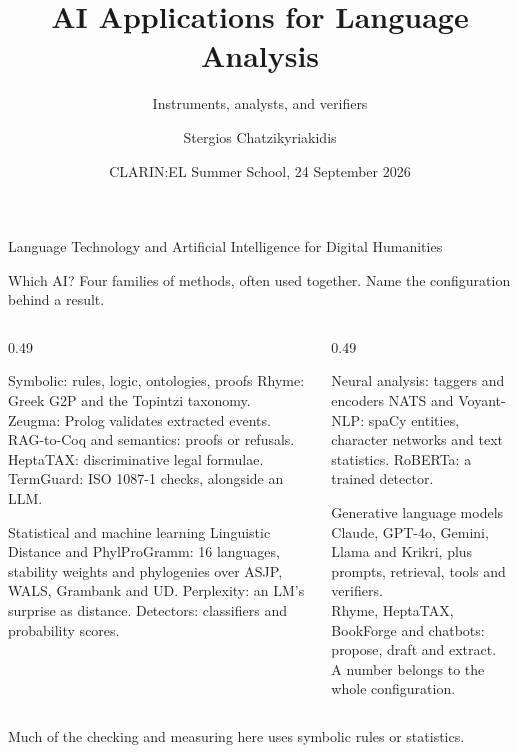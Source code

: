 \documentclass[aspectratio=169, 10pt]{beamer}
\title{AI Applications for Language Analysis}
\subtitle{Instruments, analysts, and verifiers}
\author{Stergios Chatzikyriakidis}
\institute{ILSP}
\date{CLARIN:EL Summer School, 24 September 2026}
\begin{document}
\begin{frame}
  \vspace{1em}
  {\LARGE\bfseries\inserttitle\par}
  \vspace{0.5em}
  {\large\insertsubtitle\par}
  \vspace{0.4em}{\color{terracotta}\rule{\textwidth}{1pt}}
  \vspace{0.7em}
  {\large\insertauthor\par}
  \insertinstitute\par
  \vspace{0.7em}\insertdate\par
  \small Language Technology and Artificial Intelligence for Digital Humanities
\end{frame}

\begin{frame}{Which AI?}
  \small Four families of methods, often used together. Name the configuration behind a result.
  \begin{columns}[T]
    \begin{column}{0.49\textwidth}
      \begin{block}{Symbolic: rules, logic, ontologies, proofs}
        \footnotesize Rhyme: Greek G2P and the Topintzi taxonomy.\\
        Zeugma: Prolog validates extracted events.\\
        RAG-to-Coq and semantics: proofs or refusals.\\
        HeptaTAX: discriminative legal formulae.\\
        TermGuard: ISO 1087-1 checks, alongside an LLM.
      \end{block}
      \begin{block}{Statistical and machine learning}
        \footnotesize Linguistic Distance and PhylProGramm: 16 languages, stability weights and phylogenies over ASJP, WALS, Grambank and UD. Perplexity: an LM's surprise as distance. Detectors: classifiers and probability scores.
      \end{block}
    \end{column}
    \begin{column}{0.49\textwidth}
      \begin{block}{Neural analysis: taggers and encoders}
        \footnotesize NATS and Voyant-NLP: spaCy entities, character networks and text statistics. RoBERTa: a trained detector.
      \end{block}
      \begin{block}{Generative language models}
        \footnotesize Claude, GPT-4o, Gemini, Llama and Krikri, plus prompts, retrieval, tools and verifiers.\\
        Rhyme, HeptaTAX, BookForge and chatbots: propose, draft and extract.\\
        A number belongs to the whole configuration.
      \end{block}
    \end{column}
  \end{columns}
  \footnotesize Much of the checking and measuring here uses symbolic rules or statistics.
\end{frame}
\end{document}

